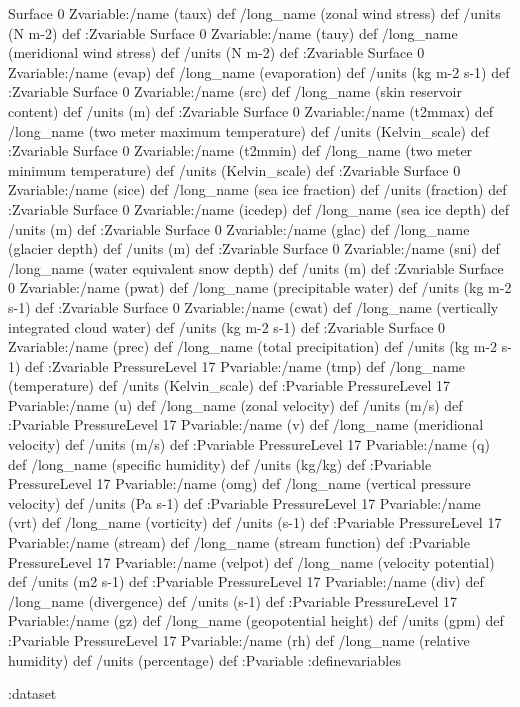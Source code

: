 \begin{ingrid}
Surface 0 Zvariable:/name (taux) def /long_name (zonal wind stress) def /units (N m-2) def  :Zvariable
Surface 0 Zvariable:/name (tauy) def /long_name (meridional wind stress) def /units (N m-2) def  :Zvariable
Surface 0 Zvariable:/name (evap) def /long_name (evaporation) def /units (kg m-2 s-1) def  :Zvariable
Surface 0 Zvariable:/name (src) def /long_name (skin reservoir content) def /units (m) def  :Zvariable
Surface 0 Zvariable:/name (t2mmax) def /long_name (two meter maximum temperature) def /units (Kelvin_scale) def  :Zvariable
Surface 0 Zvariable:/name (t2mmin) def /long_name (two meter minimum temperature) def /units (Kelvin_scale) def  :Zvariable
Surface 0 Zvariable:/name (sice) def /long_name (sea ice fraction) def /units (fraction) def  :Zvariable
Surface 0 Zvariable:/name (icedep) def /long_name (sea ice depth) def /units (m) def  :Zvariable
Surface 0 Zvariable:/name (glac) def /long_name (glacier depth) def /units (m) def  :Zvariable
Surface 0 Zvariable:/name (sni) def /long_name (water equivalent snow depth) def /units (m) def  :Zvariable
Surface 0 Zvariable:/name (pwat) def /long_name (precipitable water) def /units (kg m-2 s-1) def  :Zvariable
Surface 0 Zvariable:/name (cwat) def /long_name (vertically integrated cloud water) def /units (kg m-2 s-1) def  :Zvariable
Surface 0 Zvariable:/name (prec) def /long_name (total precipitation) def /units (kg m-2 s-1) def  :Zvariable
PressureLevel 17 Pvariable:/name (tmp) def /long_name (temperature) def /units (Kelvin_scale) def  :Pvariable
PressureLevel 17 Pvariable:/name (u) def /long_name (zonal velocity) def /units (m/s) def  :Pvariable
PressureLevel 17 Pvariable:/name (v) def /long_name (meridional velocity) def /units (m/s) def  :Pvariable
PressureLevel 17 Pvariable:/name (q) def /long_name (specific humidity) def /units (kg/kg) def  :Pvariable
PressureLevel 17 Pvariable:/name (omg) def /long_name (vertical pressure velocity) def /units (Pa s-1) def  :Pvariable
PressureLevel 17 Pvariable:/name (vrt) def /long_name (vorticity) def /units (s-1) def  :Pvariable
PressureLevel 17 Pvariable:/name (stream) def /long_name (stream function) def :Pvariable
PressureLevel 17 Pvariable:/name (velpot) def /long_name (velocity potential) def /units (m2 s-1) def  :Pvariable
PressureLevel 17 Pvariable:/name (div) def /long_name (divergence) def /units (s-1) def  :Pvariable
PressureLevel 17 Pvariable:/name (gz) def /long_name (geopotential height) def /units (gpm) def  :Pvariable
PressureLevel 17 Pvariable:/name (rh) def /long_name (relative humidity) def /units (percentage) def  :Pvariable
:definevariables

:dataset

\end{ingrid}
